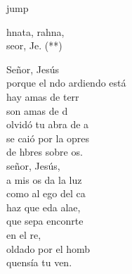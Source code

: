 \begin{cancion}[Marahnata][Nico]jump\\
	\begin{chorus}%
		hnata, rahna,\\
		 seor, Je. (**)\jump\\
	\end{chorus}%
	\jump
	 Señor, Jesús\\
	porque el ndo ardiendo está\\
	hay amas de terr \\
	son amas de d \\
	 olvidó tu abra de a \\
	se caió por la opres \\
	de hbres sobre os.\\
	\jump
	 señor, Jesús,\\
	a mis os da la luz\\
	como al ego del ca \\
	haz que eda alae,\\
	que sepa enconrte\\
	en el re,\\
	oldado por el homb \\
	quensía tu ven.\\
\end{cancion}%
